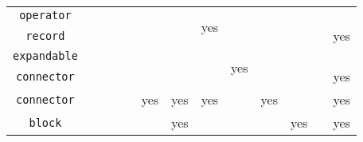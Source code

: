 \begin{center}
{\begin{tabular}{|c||c|c|c|c|c|c|c|c|c|c|c|c|}
    \hline
    {\lstinline!operator!}          &                          &                           &                                            &                      &                          &                          & \multirow{2}{*}{yes}     &                          &                            &                          &                        & \cellcolor{lightgray}                      \\
    {\lstinline!record!}            &                          &                           &                                            &                      &                          &                          &                          &                          &                            &                          &                        & \multirow{-2}{*}{\cellcolor{lightgray}yes} \\
    \hline
    {\lstinline!expandable!}        &                          &                           &                                            &                      &                          &                          &                          & \multirow{2}{*}{yes}     &                            &                          &                        & \cellcolor{lightgray}                      \\
    {\lstinline!connector!}         &                          &                           &                                            &                      &                          &                          &                          &                          &                            &                          &                        & \multirow{-2}{*}{\cellcolor{lightgray}yes} \\
    \hline
    {\lstinline!connector!}         &                          &                           &                                            &                      & \cellcolor{lightgray}yes & \cellcolor{lightgray}yes & \cellcolor{lightgray}yes &                          & yes                        &                          &                        & \cellcolor{lightgray}yes                   \\
    \hline
    {\lstinline!block!}             &                          &                           &                                            &                      &                          & \cellcolor{lightgray}yes &                          &                          &                            & yes                      &                        & \cellcolor{lightgray}yes                   \\

\end{tabular}}
\end{center}
